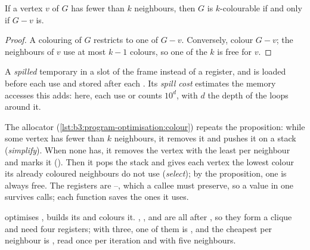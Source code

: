 \begin{proposition}[Simplify]\label{prop:b3:program-optimisation:simplify}
If a vertex $v$ of $G$ has fewer than $k$ neighbours, then $G$ is $k$-colourable if and only if $G - v$ is.
\end{proposition}

\begin{proof}
A colouring of $G$ restricts to one of $G - v$. Conversely, colour $G - v$; the neighbours of $v$ use at most $k - 1$ colours, so one of the $k$ is free for $v$.
\end{proof}

\begin{definition}[Spill]\label{def:b3:program-optimisation:spill}
A \emph{spilled} temporary  in a slot of the frame instead of a register, and is loaded before each use and stored after each . Its \emph{spill cost} estimates the memory accesses this adds: here, each use or  counts $10^{d}$, with $d$ the depth of the loops around it.
\end{definition}

The allocator (\cref{lst:b3:program-optimisation:colour}) repeats the proposition: while some vertex has fewer than $k$ neighbours, it removes it and pushes it on a stack (\emph{simplify}). When none has, it removes the vertex with the least  per neighbour and marks it  (\emph{}). Then it pops the stack and gives each vertex the lowest colour its already coloured neighbours do not use (\emph{select}); by the proposition, one is always free. The registers are --, which a callee must preserve, so a value in one survives calls; each function saves the ones it uses. %

\label{lst:b3:program-optimisation:colour}

 optimises , builds its  and colours it. , ,  and  are all  after , so they form a clique and need four registers; with three, one of them is , and the cheapest per neighbour is , read once per iteration and with five neighbours.

